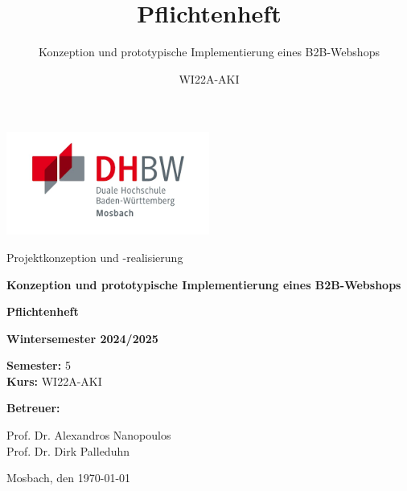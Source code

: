 \documentclass[%
	ngerman,
	12pt,
	a4paper,
	oneside,
	parskip=full
]{scrbook}
\title{Pflichtenheft}
\subtitle{Konzeption und prototypische Implementierung eines B2B-Webshops}
\author{WI22A-AKI}
\begin{document}

\begin{titlepage}
	\centering
	\includegraphics[width=0.5\textwidth]{Media/dhbwlogo.png}\vspace{1cm}

	{\large Projektkonzeption und -realisierung\par}
	\vspace{0.5cm}
	{\Large\bfseries Konzeption und prototypische Implementierung eines B2B-Webshops\par}
	\vspace{1.5cm}

	{\Huge \textbf{Pflichtenheft}\par}
	\vspace{2cm}

	\doublespacing
	{\large \textbf{Wintersemester 2024/2025}\par}
	\textbf{Semester:} 5\\
	\textbf{Kurs:} WI22A-AKI

	\vspace{2cm}

	{\large\textbf{Betreuer:}\par}
	{\large Prof. Dr. Alexandros Nanopoulos} \\
	{\large Prof. Dr. Dirk Palleduhn}

	\vfill

	Mosbach, den \today  %

\end{titlepage}
\end{document}

